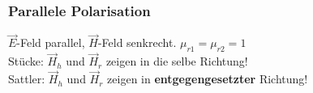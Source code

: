 \subsubsection{Parallele Polarisation}
\begin{center}

\end{center}
$\vec{E}$-Feld parallel, $ \vec{H}$-Feld senkrecht. \qquad $ \mu_{r1} = \mu_{r2} =1 $\\

Stücke: $\vec{H}_h$ und $ \vec{H}_r$ zeigen in die selbe Richtung!\\
Sattler: $\vec{H}_h$ und $ \vec{H}_r$ zeigen in \textbf{entgegengesetzter} Richtung!\\

